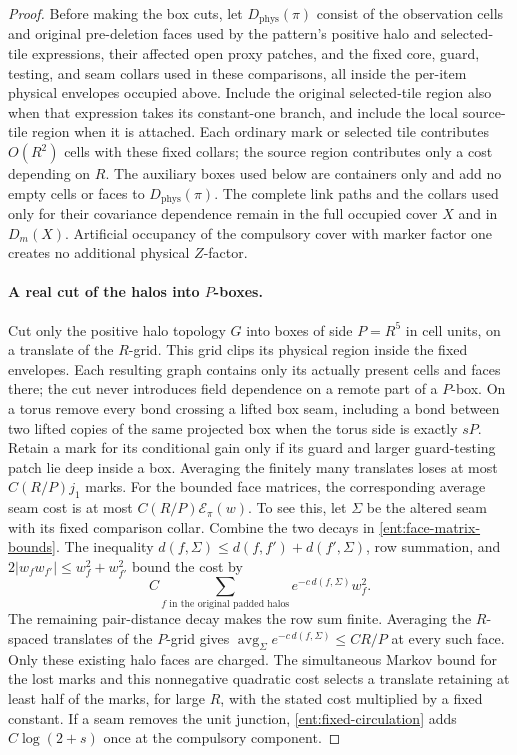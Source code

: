 \begin{proof}
Before making the box cuts, let \(D_{\mathrm{phys}}(\pi)\) consist of
the observation cells and original pre-deletion faces used by the
pattern's positive halo and selected-tile expressions, their affected
open proxy patches, and the fixed core, guard, testing, and seam collars
used in these comparisons, all inside the per-item physical envelopes
occupied above.  Include the original selected-tile region
also when that expression takes its constant-one branch, and include
the local source-tile region when it is attached.  Each ordinary mark
or selected tile contributes \(O(R^2)\) cells with these fixed collars;
the source region contributes only a cost depending on \(R\).
The auxiliary boxes used below are containers only and add no empty
cells or faces to \(D_{\mathrm{phys}}(\pi)\).
The complete link paths and the collars used only for their covariance
dependence remain in the full occupied cover \(X\) and in \(D_m(X)\).
Artificial occupancy of the compulsory cover with marker factor one
creates no additional physical \(Z\)-factor.

\paragraph{A real cut of the halos into \(P\)-boxes.}
Cut only the positive halo topology \(G\) into boxes of
side \(P=R^5\) in cell units, on a translate of the \(R\)-grid.
This grid clips its physical region inside the fixed envelopes.
Each resulting graph contains
only its actually present cells and faces there; the cut never
introduces field dependence on a remote part of a \(P\)-box.
On a torus remove every bond crossing a lifted box seam, including a
bond between two lifted copies of the same projected box when the
torus side is exactly \(sP\).
Retain a mark for its conditional gain only if its guard and
larger guard-testing patch lie deep inside a box.  Averaging the
finitely many translates loses at most \(C(R/P)j_1\) marks.
For the bounded face matrices, the corresponding average
seam cost is at most \(C(R/P)\mathcal E_\pi(w)\).  To see this,
let \(\Sigma\) be the altered seam with its fixed comparison collar.
Combine the two decays in \eqref{ent:face-matrix-bounds}.
The inequality \(d(f,\Sigma)\le d(f,f')+d(f',\Sigma)\),
row summation, and \(2|w_fw_{f'}|\le w_f^2+w_{f'}^2\) bound
the cost by
\[
 C\sum_{f\text{ in the original padded halos}}
                  e^{-c\,d(f,\Sigma)}w_f^2.
\]
The remaining pair-distance decay makes the row sum finite.
Averaging the \(R\)-spaced translates of the \(P\)-grid gives
\(\operatorname{avg}_{\Sigma}e^{-c\,d(f,\Sigma)}\le CR/P\)
at every such face.  Only these existing halo faces are charged.
The simultaneous Markov bound for the lost marks
and this nonnegative quadratic cost selects a translate
retaining at least half of the marks, for large \(R\), with
the stated cost multiplied by a fixed constant.  If a seam
removes the unit junction, \eqref{ent:fixed-circulation}
adds \(C\log(2+s)\) once at the compulsory component.


\end{proof}

